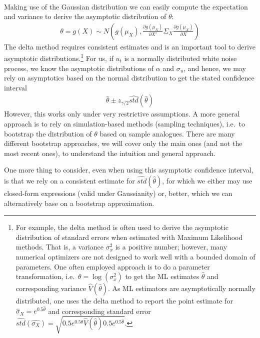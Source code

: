 \begin{enumerate}
\begin{align*}
\end{align*}
Making use of the Gaussian distribution we can easily compute the expectation and variance to derive the asymptotic distribution of \(\theta \):
\begin{align*}
  \theta = g(X) \sim N\left(g(\mu_X),\frac{\partial g(\mu_X)}{\partial X'} \Sigma_X \frac{\partial g(\mu_X)}{\partial X}\right)
\end{align*}
The delta method requires consistent estimates and is an important tool to derive asymptotic distributions.\footnote{%
  For example, the delta method is often used to derive the asymptotic distribution of standard errors when estimated with Maximum Likelihood methods.
  That is, a variance \(\sigma_x^2\) is a positive number;
  however, many numerical optimizers are not designed to work well with a bounded domain of parameters.
  One often employed approach is to do a parameter transformation, i.e.\
  \(\theta =\log(\sigma_x^2)\)
  to get the ML estimates \(\hat{\theta}\) and corresponding variance \(\hat{V}(\hat{\theta})\).
  As ML estimators are asymptotically normally distributed,
  one uses the delta method to report the point estimate for \(\hat{\sigma}_X = e^{0.5 \hat{\theta}}\)
  and corresponding standard error \(\hat{std}(\hat{\sigma_X}) = \sqrt{0.5 e^{0.5\hat{\theta}} \hat{V}(\hat{\theta}) 0.5 e^{0.5\hat{\theta}}}\).
}
For us, if \(u_t\) is a normally distributed white noise process,
  we know the asymptotic distributions of \(\alpha\) and \(\sigma_u\),
  and hence, we may rely on asymptotics based on the normal distribution
  to get the stated confidence interval
  \begin{align*}
  \hat{\theta} \pm z_{\gamma/2} \widehat{std}(\hat{\theta})
  \end{align*}
However, this works only under very restrictive assumptions.
A more general approach is to rely on simulation-based methods (sampling techniques),
  i.e.\ to bootstrap the distribution of \(\theta\) based on sample analogues.
There are many different bootstrap approaches,
  we will cover only the main ones (and not the most recent ones),
  to understand the intuition and general approach.

One more thing to consider, even when using this asymptotic confidence interval, is that we rely on a consistent estimate for \(\widehat{std}(\hat{\theta})\),
  for which we either may use closed-form expressions (valid under Gaussianity) or, better, which we can alternatively base on a bootstrap approximation.


\end{enumerate}
